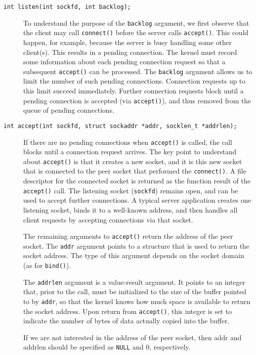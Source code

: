 \begin{description}
\item[\texttt{int listen(int sockfd, int backlog);}] To understand the purpose of the
  \texttt{backlog} argument, we first observe that the client may call \texttt{connect()}
  before the server calls \texttt{accept()}. This could happen, for example, because the
  server is busy handling some other client(s). This results in a pending connection. The
  kernel must record some information about each pending connection request so that a
  subsequent \texttt{accept()} can be processed. The \texttt{backlog} argument allows us
  to limit the number of such pending connections. Connection requests up to this limit
  succeed immediately. Further connection requests block until a pending connection is
  accepted (via \texttt{accept()}), and thus removed from the queue of pending
  connections.
\item[\texttt{int accept(int sockfd, struct sockaddr *addr, socklen\_t *addrlen);}] If
  there are no pending connections when \texttt{accept()} is called, the call blocks until
  a connection request arrives. The key point to understand about \texttt{accept()} is
  that it creates a new socket, and it is this new socket that is connected to the peer
  socket that performed the \texttt{connect()}. A file descriptor for the connected socket
  is returned as the function result of the \texttt{accept()} call. The listening socket
  (\texttt{sockfd}) remains open, and can be used to accept further connections. A typical
  server application creates one listening socket, binds it to a well-known address, and
  then handles all client requests by accepting connections via that socket.

  The remaining arguments to \texttt{accept()} return the address of the peer socket. The
  \texttt{addr} argument points to a structure that is used to return the socket
  address. The type of this argument depends on the socket domain (as for
  \texttt{bind()}).

  The \texttt{addrlen} argument is a value-result argument. It points to an integer that,
  prior to the call, must be initialized to the size of the buffer pointed to by
  \texttt{addr}, so that the kernel knows how much space is available to return the socket
  address. Upon return from \texttt{accept()}, this integer is set to indicate the number
  of bytes of data actually copied into the buffer.

  If we are not interested in the address of the peer socket, then addr and addrlen
  should be specified as \texttt{NULL} and 0, respectively.
\end{description}

